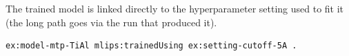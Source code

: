 The trained model is linked directly to the hyperparameter setting
used to fit it (the long path goes via the run that produced it).
\begin{lstlisting}[language=turtle]
ex:model-mtp-TiAl mlips:trainedUsing ex:setting-cutoff-5A .
\end{lstlisting}
